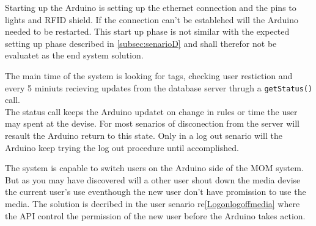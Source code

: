 Starting up the Arduino is setting up the ethernet connection and the pins to lights and RFID shield. If the connection can't be establehed will the Arduino needed to be restarted. This start up phase is not similar with the expected setting up phase described in \ref{subsec:senarioD} and shall therefor not be evaluatet as the end system solution.

The main time of the system is looking for tags, checking user restiction and every 5 miniuts recieving updates from the database server thrugh a \verb|getStatus()| call. \\
The status call keeps the Arduino updatet on change in rules or time the user may spent at the devise.      
For most senarios of disconection from the server will resault the Arduino return to this state. 
Only in a log out senario will the Arduino keep trying the log out procedure until accomplished.

The system is capable to switch users on the Arduino side of the MOM system. But as you may have discovered will a other user shout down the media devise the current user's use eventhough the new user don't have promission to use the media. The solution is decribed in the user senario re\ref{Logonlogoffmedia} where the API control the permission of the new user before the Arduino takes action.       

